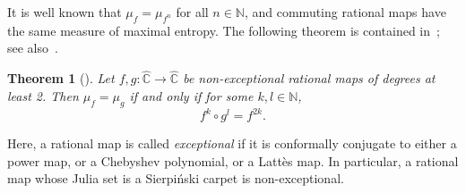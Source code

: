 \documentclass[12pt]{amsart}
\makeatletter
\newtheorem{thm}{Theorem}[section]
\newtheorem*{pf}{Proof}
\newcommand{\C}{\mathbb{C}}
\newcommand{\N}{\mathbb{N}}
\newcommand{\hC}{\widehat{\C}}
\newcommand{\J}{\mathcal{J}}
\newcommand{\co}{\colon}
\renewenvironment{pf}[1][\proofname]{%
  \par
  \pushQED{\qed}%
  \normalfont\topsep6\p@ \@plus6\p@ \trivlist
  \item[\hskip\labelsep\itshape
        \bfseries #1\@addpunct{:}]%
  \ignorespaces
}{%
  \popQED\endtrivlist
}
\makeatother
\begin{document}
It is well known that $\mu_f=\mu_{f^n}$ for all $n\in\N$, and commuting rational maps have the same measure of maximal entropy.
The following theorem is contained in~\cite{Le, Le2, LP}; see also~\cite[Theorem~1.7]{Ye}. 
\begin{thm}[\cite{Le, Le2, LP, Ye}]\label{thm:jutoeq}
Let $f, g\co\hC \to \hC$ be non-exceptional rational maps of degrees at least 2. 
Then $\mu_f=\mu_g$ if and only if for some $k, l\in \N$, 
 $$
  f^k\circ g^l=f^{2k}.
  $$
\end{thm}
  Here, a rational map is called \emph{exceptional} if it is conformally conjugate to either a power map, or a Chebyshev polynomial, or a Latt\`es map. In particular, a rational map whose Julia set is a Sierpi\'nski carpet is non-exceptional.
%
%
%
%
\end{document}
